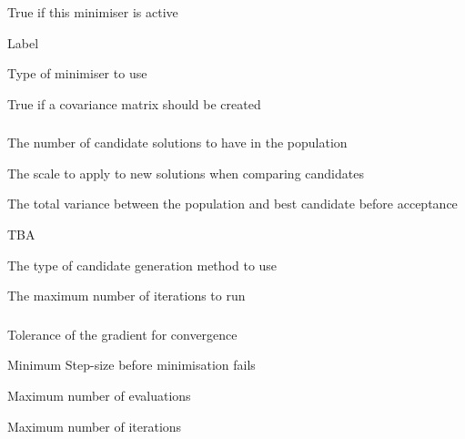 
 {True if this minimiser is active}

 {Label}

 {Type of minimiser to use}

 {True if a covariance matrix should be created}

\subsubsection[Beta Diff]{}

\subsubsection[D E Solver]{}

 {The number of candidate solutions to have in the population}

 {The scale to apply to new solutions when comparing candidates}

 {The total variance between the population and best candidate before acceptance}

 {TBA}

 {The type of candidate generation method to use}

 {The maximum number of iterations to run}

\subsubsection[D Lib]{}

\subsubsection[Gamma Diff]{}

 {Tolerance of the gradient for convergence}

 {Minimum Step-size before minimisation fails}

 {Maximum number of evaluations}

 {Maximum number of iterations}

